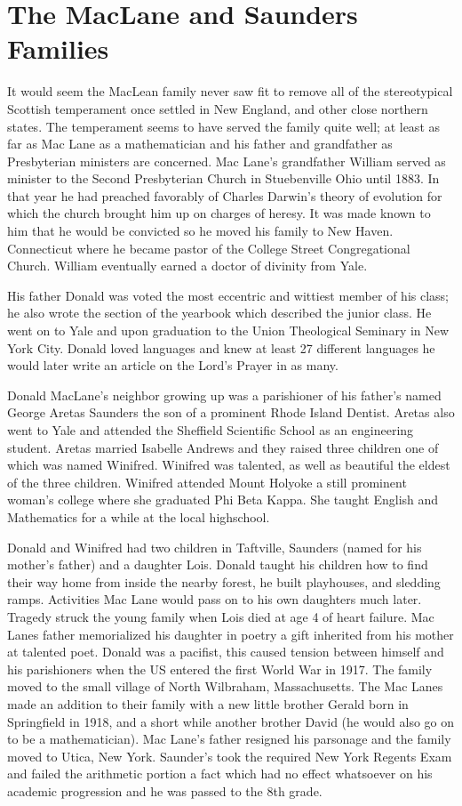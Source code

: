 \section{The MacLane and Saunders Families}

It would seem the MacLean family never saw fit to remove all of the stereotypical Scottish temperament once settled in New England, and other close northern states. The temperament seems to have served the family quite well; at least as far as Mac Lane as a mathematician and his father and grandfather as Presbyterian ministers are concerned. Mac Lane's grandfather William served as minister to the Second Presbyterian Church in Stuebenville Ohio until 1883. In that year he had preached favorably of Charles Darwin's theory of evolution for which the church brought him up on charges of heresy. It was made known to him that he would be convicted so he moved his family to New Haven. Connecticut  where he became pastor of the College Street Congregational Church. William eventually earned a doctor of divinity from Yale. 

His father Donald was voted the most eccentric and wittiest member of his class; he also wrote the section of the yearbook which described the junior class. He went on to Yale and upon graduation to the Union Theological Seminary in New York City. Donald loved languages and knew at least 27 different languages he would later write an article on the Lord's Prayer in as many. 

Donald MacLane's neighbor growing up was a parishioner of his father's named George Aretas Saunders the son of a prominent Rhode Island Dentist. Aretas also went to Yale and attended the Sheffield Scientific School as an engineering student. Aretas married Isabelle Andrews and they raised three children one of which was named Winifred. Winifred was talented, as well as beautiful the eldest of the three children. Winifred attended Mount Holyoke a still prominent woman's college where she graduated Phi Beta Kappa. She taught English and Mathematics for a while at the local highschool.

Donald and Winifred had two children in Taftville, Saunders (named for his mother's father) and a daughter Lois. Donald taught his children how to find their way home from inside the nearby forest, he built playhouses, and sledding ramps. Activities Mac Lane would pass on to his own daughters much later. Tragedy struck the young family when Lois died at age 4 of heart failure. Mac Lanes father memorialized his daughter in poetry a gift inherited from his mother at talented poet. Donald was a pacifist, this caused tension between himself and his parishioners when the US entered the first World War in 1917. The family moved to the small village of North Wilbraham, Massachusetts. The Mac Lanes made an addition to their family with a new little brother Gerald born in Springfield in 1918, and a short while another brother David (he would also go on to be a mathematician). Mac Lane's father resigned his parsonage and the family moved to Utica, New York. Saunder's took the required New York Regents Exam and failed the arithmetic portion a fact which had no effect whatsoever on his academic progression and he was passed to the 8th grade. 

